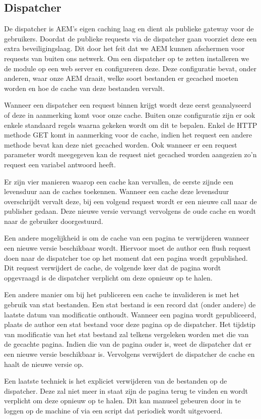 \documentclass{article}
\begin{document}
	\subsection{Dispatcher}
	De dispatcher is AEM's eigen caching laag en dient als publieke gateway voor de gebruikers. Doordat de publieke requests via de dispatcher gaan voorziet deze een extra beveiligingslaag. Dit door het feit dat we AEM kunnen afschermen voor requests van buiten ons netwerk. Om een dispatcher op te zetten installeren we de module op een web server en configureren deze. Deze configuratie bevat, onder anderen, waar onze AEM draait, welke soort bestanden er gecached moeten worden en hoe de cache van deze bestanden vervalt.
	\par	
	 Wanneer een dispatcher een request binnen krijgt wordt deze eerst geanalyseerd of deze in aanmerking komt voor onze cache. Buiten onze configuratie zijn er ook enkele standaard regels waarna gekeken wordt om dit te bepalen. Enkel de HTTP methode GET komt in aanmerking voor de cache, indien het request een andere methode bevat kan deze niet gecached worden. Ook wanneer er een request parameter wordt meegegeven kan de request niet gecached worden aangezien zo'n request een variabel antwoord heeft.
	\par
	Er zijn vier manieren waarop een cache kan vervallen, de eerste zijnde een levensduur aan de caches toekennen. Wanneer een cache deze levensduur overschrijdt vervalt deze, bij een volgend request wordt er een nieuwe call naar de publisher gedaan. Deze nieuwe versie vervangt vervolgens de oude cache en wordt naar de gebruiker doorgestuurd.
	\par
	Een andere mogelijkheid is om de cache van een pagina te verwijderen wanneer een nieuwe versie beschikbaar wordt. Hiervoor moet de author een flush request doen naar de dispatcher toe op het moment dat een pagina wordt gepublished. Dit request verwijdert de cache, de volgende keer dat de pagina wordt opgevraagd is de dispatcher verplicht om deze opnieuw op te halen.
	\par
	 Een andere manier om bij het publiceren een cache te invalideren is met het gebruik van stat bestanden. Een stat bestand is een record dat (onder andere) de laatste datum van modificatie onthoudt. Wanneer een pagina wordt gepubliceerd, plaats de author een stat bestand voor deze pagina op de dispatcher. Het tijdstip van modificatie van het stat bestand zal telkens vergeleken worden met die van de gecachte pagina. Indien die van de pagina ouder is, weet de dispatcher dat er een nieuwe versie beschikbaar is. Vervolgens verwijdert de dispatcher de cache en haalt de nieuwe versie op.
	 \par
	 Een laatste techniek is het expliciet verwijderen van de bestanden op de dispatcher. Deze zal niet meer in staat zijn de pagina terug te vinden en wordt verplicht om deze opnieuw op te halen. Dit kan manueel gebeuren door in te loggen op de machine of via een script dat periodiek wordt uitgevoerd.
\end{document}
